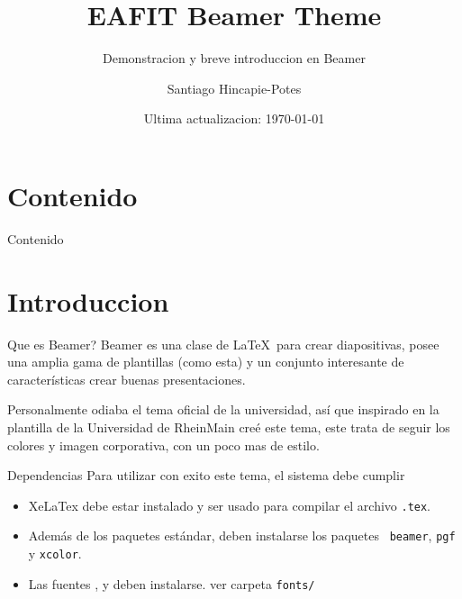 \documentclass[compress]{beamer}
\title{EAFIT Beamer Theme}
\subtitle{Demonstracion y breve introduccion en Beamer}
\date{Ultima actualizacion: \today}
\author{Santiago Hincapie-Potes}
\institute{Universidad EAFIT}
\begin{document}

\maketitle

\section*{Contenido}
\begin{frame}{Contenido}
	\tableofcontents[hideallsubsections]
\end{frame}

\section{Introduccion}

\begin{frame}{Que es Beamer?}
  Beamer es una clase de \LaTeX\ para crear diapositivas, posee una amplia gama
  de plantillas (como esta) y un conjunto interesante de características crear
  buenas presentaciones.

  Personalmente odiaba el tema oficial de la universidad, así que inspirado en
  la plantilla de la Universidad de RheinMain creé este tema, este trata de
  seguir los colores y imagen corporativa, con un poco mas de estilo.
\end{frame}

\begin{frame}{Dependencias}
	Para utilizar con exito este tema, el sistema debe cumplir
	\begin{itemize}
		\item XeLaTex debe estar instalado y ser usado para compilar el archivo
		\texttt{.tex}.
		\item Además de los paquetes estándar, deben instalarse los paquetes \
		\texttt{beamer}, \texttt{pgf} y \texttt{xcolor}.
		\item Las fuentes ,  y
		 deben instalarse. ver carpeta \texttt{fonts/}
	\end{itemize}
\end{frame}
\end{document}
